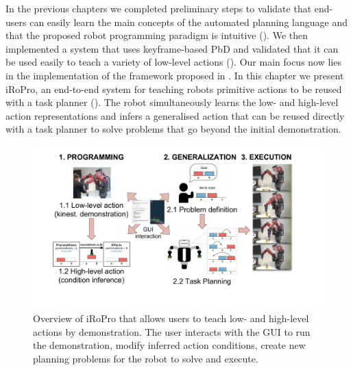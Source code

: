 In the previous chapters we completed preliminary steps to validate that end-users can easily learn the main concepts of the automated planning language and that the proposed robot programming paradigm is intuitive ().
We then implemented a system that uses keyframe-based PbD and validated that it can be used easily to teach a variety of low-level actions ().
Our main focus now lies in the implementation of the framework proposed in .
In this chapter we present iRoPro, an end-to-end system for teaching robots primitive actions to be reused with a task planner ().
The robot simultaneously learns the low- and high-level action representations and infers a generalised action that can be reused directly with a task planner to solve problems that go beyond the initial demonstration.

\begin{figure}[h]
	\centering
	\includegraphics[width=0.95\linewidth]{figures/overview.pdf}
	\caption{Overview of iRoPro that allows users to teach low- and high-level actions by demonstration. The user interacts with the GUI to run the demonstration, modify inferred action conditions, create new planning problems for the robot to solve and execute.}
	\label{fig:overview}
\end{figure}	

